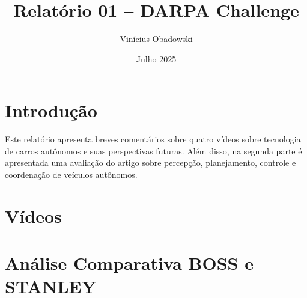 \documentclass[12pt, a4paper]{article}
\title{Relatório 01 -- DARPA Challenge}
\author{Vinícius Obadowski}
\date{Julho 2025}
\begin{document}
\maketitle

\section{Introdução}

Este relatório apresenta breves comentários sobre quatro vídeos \cite{cleanerwatt,basicthinking,frankyoutube} sobre tecnologia de carros autônomos e suas perspectivas futuras. Além disso, na segunda parte é apresentada uma avaliação do artigo \cite{Pendleton2017Autonomous} sobre percepção, planejamento, controle e coordenação de veículos autônomos.

\section{Vídeos}



\section{Análise Comparativa BOSS e STANLEY}



% 
\printbibliography
\end{document}
